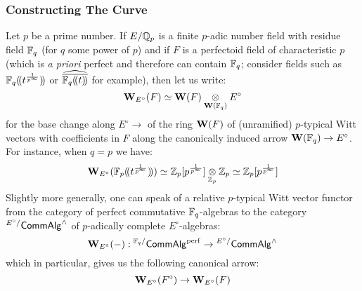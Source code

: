             \subsubsection{Constructing The Curve}
                \begin{convention} \label{conv: relative_witt_vectors}
                    Let $p$ be a prime number. If $E/\mathbb{Q}_p$ is a finite $p$-adic number field with residue field $\mathbb{F}_q$ (for $q$ some power of $p$) and if $F$ is a perfectoid field of characteristic $p$ (which is \textit{a priori} perfect and therefore can contain $\mathbb{F}_q$; consider fields such as $\mathbb{F}_q(\!(t^{\frac{1}{p^{\infty}}})\!)$ or $\widehat{\overline{\mathbb{F}_q(\!(t)\!)}}$ for example), then let us write:
                        $$\W_{E^{\circ}}(F) \cong \W(F) \tensor_{\W(\F_q)} E^{\circ}$$
                    for the base change along $E^{\circ} \to $ of the ring $\mathbf{W}(F)$ of (unramified) $p$-typical Witt vectors with coefficients in $F$ along the canonically induced arrow $\mathbf{W}(\mathbb{F}_q) \to E^{\circ}$. For instance, when $q = p$ we have:
                        $$\W_{E^{\circ}}(\F_p(\!(t^{\frac{1}{p^{\infty}}})\!)) \cong \Z_p[p^{\frac{1}{p^{\infty}}}] \tensor_{\Z_p} \Z_p \cong \Z_p[p^{\frac{1}{p^{\infty}}}]$$
                    Slightly more generally, one can speak of a relative $p$-typical Witt vector functor from the category of perfect commutative $\mathbb{F}_q$-algebras to the category ${}^{E^{\circ}/}\mathsf{Comm}\mathsf{Alg}^{\wedge}$ of $p$-adically complete $E^{\circ}$-algebras:
                        $$\mathbf{W}_{E^{\circ}}(-): {}^{\mathbb{F}_q/}\mathsf{Comm}\mathsf{Alg}^{\mathrm{perf}} \to {}^{E^{\circ}/}\mathsf{Comm}\mathsf{Alg}^{\wedge}$$
                    which in particular, gives us the following canonical arrow:
                        $$\mathbf{W}_{E^{\circ}}(F^{\circ}) \to \mathbf{W}_{E^{\circ}}(F)$$
                \end{convention}
                
